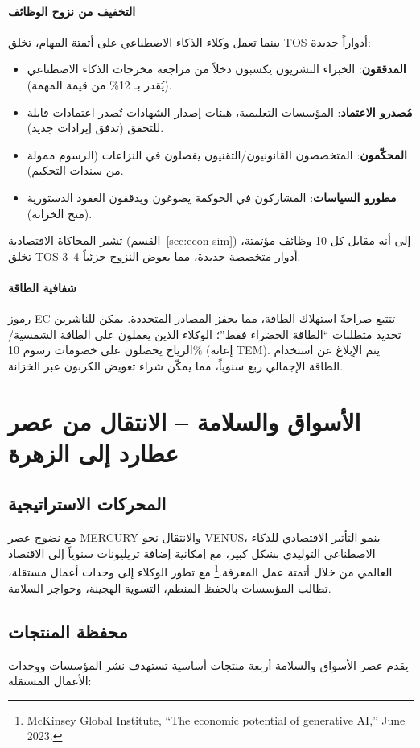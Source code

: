 \documentclass[11pt]{article}
\begin{document}
\paragraph{التخفيف من نزوح الوظائف} بينما تعمل وكلاء الذكاء الاصطناعي على أتمتة المهام، تخلق TOS أدواراً جديدة:
\begin{itemize}[noitemsep]
  \item \textbf{المدققون}: الخبراء البشريون يكسبون دخلاً من مراجعة مخرجات الذكاء الاصطناعي (يُقدر بـ 12\% من قيمة المهمة).
  \item \textbf{مُصدرو الاعتماد}: المؤسسات التعليمية، هيئات إصدار الشهادات تُصدر اعتمادات قابلة للتحقق (تدفق إيرادات جديد).
  \item \textbf{المحكّمون}: المتخصصون القانونيون/التقنيون يفصلون في النزاعات (الرسوم ممولة من سندات التحكيم).
  \item \textbf{مطورو السياسات}: المشاركون في الحوكمة يصوغون ويدققون العقود الدستورية (منح الخزانة).
\end{itemize}
تشير المحاكاة الاقتصادية (القسم~\ref{sec:econ-sim}) إلى أنه مقابل كل 10 وظائف مؤتمتة، تخلق TOS 3--4 أدوار متخصصة جديدة، مما يعوض النزوح جزئياً.

\paragraph{شفافية الطاقة} رموز EC تتتبع صراحةً استهلاك الطاقة، مما يحفز المصادر المتجددة. يمكن للناشرين تحديد متطلبات ``الطاقة الخضراء فقط''؛ الوكلاء الذين يعملون على الطاقة الشمسية/الرياح يحصلون على خصومات رسوم 10\% (إعانة TEM). يتم الإبلاغ عن استخدام الطاقة الإجمالي ربع سنوياً، مما يمكّن شراء تعويض الكربون عبر الخزانة.

\section{الأسواق والسلامة -- الانتقال من عصر عطارد إلى الزهرة}
\subsection{المحركات الاستراتيجية}
مع نضوج عصر MERCURY والانتقال نحو VENUS، ينمو التأثير الاقتصادي للذكاء الاصطناعي التوليدي بشكل كبير، مع إمكانية إضافة تريليونات سنوياً إلى الاقتصاد العالمي من خلال أتمتة عمل المعرفة.\footnote{McKinsey Global Institute, ``The economic potential of generative AI,'' June 2023.} مع تطور الوكلاء إلى وحدات أعمال مستقلة، تطالب المؤسسات بالحفظ المنظم، التسوية الهجينة، وحواجز السلامة.

\subsection{محفظة المنتجات}
يقدم عصر الأسواق والسلامة أربعة منتجات أساسية تستهدف نشر المؤسسات ووحدات الأعمال المستقلة:
\end{document}
